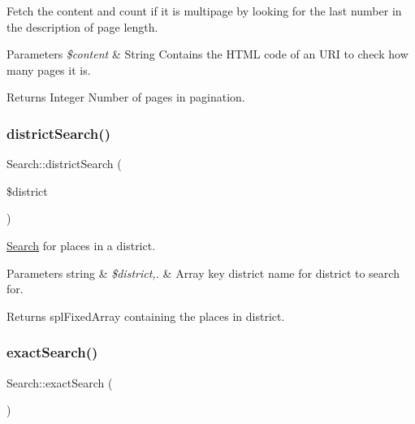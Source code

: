 Fetch the content and count if it is multipage by looking for the last number in the description of page length. 


\begin{DoxyParams}{Parameters}
{\em \$content} & String Contains the H\+T\+ML code of an U\+RI to check how many pages it is.\\
\hline
\end{DoxyParams}
\begin{DoxyReturn}{Returns}
Integer Number of pages in pagination. 
\end{DoxyReturn}
\hypertarget{class_search_abed37f92ad0062d99e00965ee0c9d02e}{}\label{class_search_abed37f92ad0062d99e00965ee0c9d02e} 
\subsubsection{\texorpdfstring{district\+Search()}{districtSearch()}}
{\footnotesize\ttfamily Search\+::district\+Search (\begin{DoxyParamCaption}\item[{}]{\$district }\end{DoxyParamCaption})}



\hyperlink{class_search}{Search} for places in a district. 


\begin{DoxyParams}[1]{Parameters}
string & {\em \$district,.} & Array key district name for district to search for.\\
\hline
\end{DoxyParams}
\begin{DoxyReturn}{Returns}
spl\+Fixed\+Array containing the places in district. 
\end{DoxyReturn}
\hypertarget{class_search_a6469a0900a719795f117999646e78670}{}\label{class_search_a6469a0900a719795f117999646e78670} 
\subsubsection{\texorpdfstring{exact\+Search()}{exactSearch()}}
{\footnotesize\ttfamily Search\+::exact\+Search (\begin{DoxyParamCaption}{ }\end{DoxyParamCaption})\hspace{0.3cm}{\ttfamily [private]}}



